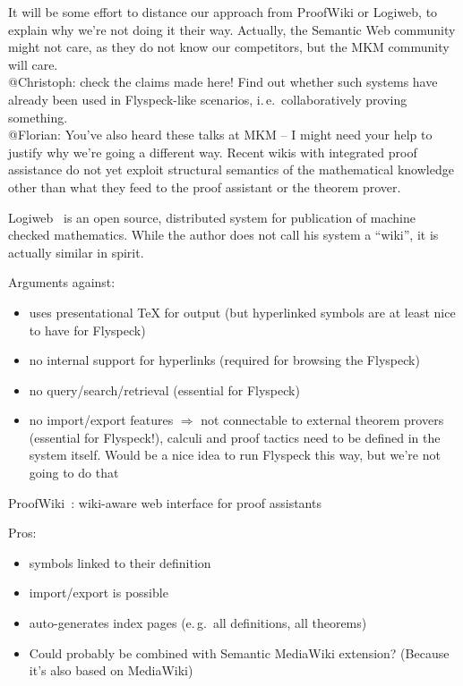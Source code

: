 \documentclass{llncs}
\begin{document}
\begin{todo}{It will be some effort to distance our approach from ProofWiki or Logiweb,
  to explain why we're not doing it their way. Actually, the Semantic Web community might
  not care, as they do not know our competitors, but the MKM community will
  care.\\
  @Christoph: check the claims made here!  Find out whether such systems have already
  been used in Flyspeck-like scenarios, i.\,e.\ collaboratively proving something.\\
  @Florian: You've also heard these talks at MKM -- I might need your help to justify why
  we're going a different way.}  Recent wikis with integrated proof assistance do not yet
exploit structural semantics of the mathematical knowledge other than what they feed to
the proof assistant or the theorem prover.

  Logiweb~\cite{Grue:Logiweb07} is an open source, distributed system for publication of
  machine checked mathematics.  While the author does not call his system a ``wiki'', it
  is actually similar in spirit.

  Arguments against:
  \begin{itemize}
  \item uses presentational {\TeX} for output (but hyperlinked symbols are at least nice
    to have for Flyspeck)
  \item no internal support for hyperlinks (required for browsing the Flyspeck)
  \item no query/search/retrieval (essential for Flyspeck)
  \item no import/export features $\Rightarrow$ not connectable to external theorem
    provers (essential for Flyspeck!), calculi and proof tactics need to be defined in the
    system itself.  Would be a nice idea to run Flyspeck this way, but we're not going to
    do that
  \end{itemize}

  ProofWiki~\cite{CorKal:CoopReposFormalProofs07}:
  wiki-aware web interface for proof assistants

  Pros:
  \begin{itemize}
  \item symbols linked to their definition
  \item import/export is possible
  \item auto-generates index pages (e.\,g.\ all definitions, all theorems)
  \item Could probably be combined with Semantic MediaWiki extension?  (Because it's also
    based on MediaWiki)
  \end{itemize}


\end{todo}
\end{document}
